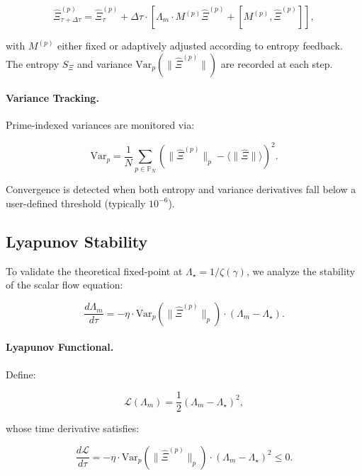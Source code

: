 \documentclass[12pt]{article}
\theoremstyle{plain}
\begin{document}
\begin{equation}
\hat{\Xi}^{(p)}_{\tau+\Delta\tau} = \hat{\Xi}^{(p)}_\tau + \Delta\tau \cdot \left[ \Lambda_m \cdot M^{(p)} \hat{\Xi}^{(p)} + \left[ M^{(p)}, \hat{\Xi}^{(p)} \right] \right],
\end{equation}

with $M^{(p)}$ either fixed or adaptively adjusted according to entropy feedback. The entropy $S_\Xi$ and variance $\text{Var}_p(\|\hat{\Xi}^{(p)}\|)$ are recorded at each step.

\paragraph{Variance Tracking.} Prime-indexed variances are monitored via:

\begin{equation}
\text{Var}_p = \frac{1}{N} \sum_{p \in \mathbb{P}_N} \left( \|\hat{\Xi}^{(p)}\|_p - \langle \|\hat{\Xi}\| \rangle \right)^2.
\end{equation}

Convergence is detected when both entropy and variance derivatives fall below a user-defined threshold (typically $10^{-6}$).

\subsection{Lyapunov Stability}

To validate the theoretical fixed-point at $\Lambda_\star = 1/\zeta(\gamma)$, we analyze the stability of the scalar flow equation:

\begin{equation}
\frac{d\Lambda_m}{d\tau} = -\eta \cdot \text{Var}_p(\|\hat{\Xi}^{(p)}\|_p) \cdot (\Lambda_m - \Lambda_\star).
\end{equation}

\paragraph{Lyapunov Functional.} Define:

\begin{equation}
\mathcal{L}(\Lambda_m) = \frac{1}{2}(\Lambda_m - \Lambda_\star)^2,
\end{equation}

whose time derivative satisfies:

\begin{equation}
\frac{d\mathcal{L}}{d\tau} = -\eta \cdot \text{Var}_p(\|\hat{\Xi}^{(p)}\|_p) \cdot (\Lambda_m - \Lambda_\star)^2 \leq 0.
\end{equation}
\end{document}
